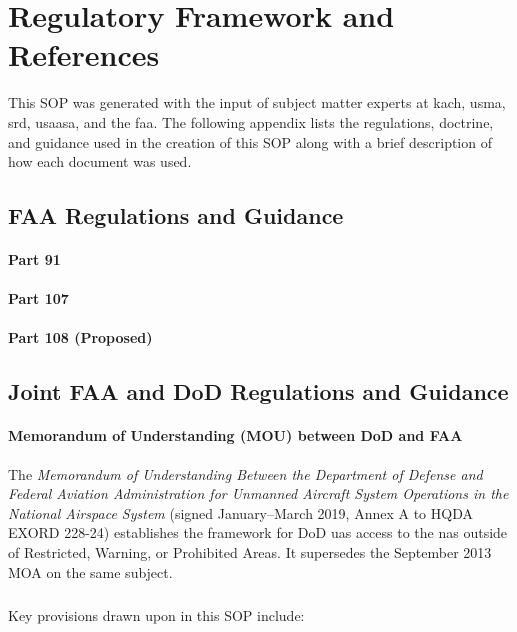 \chapter{Regulatory Framework and References}\label{ch:references}

This SOP was generated with the input of subject matter experts at \ac{kach}, \ac{usma}, \ac{srd}, \ac{usaasa}, and the \ac{faa}.  The following appendix lists the regulations, doctrine, and guidance used in the creation of this SOP along with a brief description of how each document was used.

    \section{FAA Regulations and Guidance}
        \subsubsection{Part 91}

        \subsubsection{Part 107}
        
        \subsubsection{Part 108 (Proposed)}

    \section{Joint FAA and DoD Regulations and Guidance}
        \subsubsection{Memorandum of Understanding (MOU) between DoD and FAA}
        The \textit{Memorandum of Understanding Between the Department of Defense and Federal Aviation Administration for Unmanned Aircraft System Operations in the National Airspace System} (signed January--March 2019, Annex A to HQDA EXORD 228-24) establishes the framework for DoD \ac{uas} access to the \ac{nas} outside of Restricted, Warning, or Prohibited Areas.  It supersedes the September 2013 MOA on the same subject.

        \paragraph{} Key provisions drawn upon in this SOP include:

